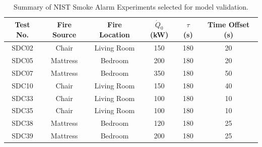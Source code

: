\begin{table}[h!]
\caption[Summary of NIST Smoke Alarm Experiments selected for model validation]{Summary of NIST Smoke Alarm Experiments selected for model validation.}
\begin{center}
\begin{tabular}{|c|c|c|c|c|c|}
\hline
Test No.  &  Fire Source  &  Fire Location  &  $\dot Q_0$ (kW)  &  $\tau$ (s)  &  Time Offset (s)  \\ \hline \hline
SDC02     &  Chair        &  Living Room    &  150              &  180         &  20               \\ \hline
SDC05     &  Mattress     &  Bedroom        &  200              &  180         &  20               \\ \hline
SDC07     &  Mattress     &  Bedroom        &  350              &  180         &  50               \\ \hline
SDC10     &  Chair        &  Living Room    &  150              &  180         &  40               \\ \hline
SDC33     &  Chair        &  Living Room    &  100              &  180         &  10               \\ \hline
SDC35     &  Chair        &  Living Room    &  100              &  180         &  10               \\ \hline
SDC38     &  Mattress     &  Bedroom        &  120              &  180         &  25               \\ \hline
SDC39     &  Mattress     &  Bedroom        &  200              &  180         &  25               \\ \hline
\end{tabular}
\end{center}
\label{tab:NIST_Smoke_Alarms_Summary}
\end{table}

